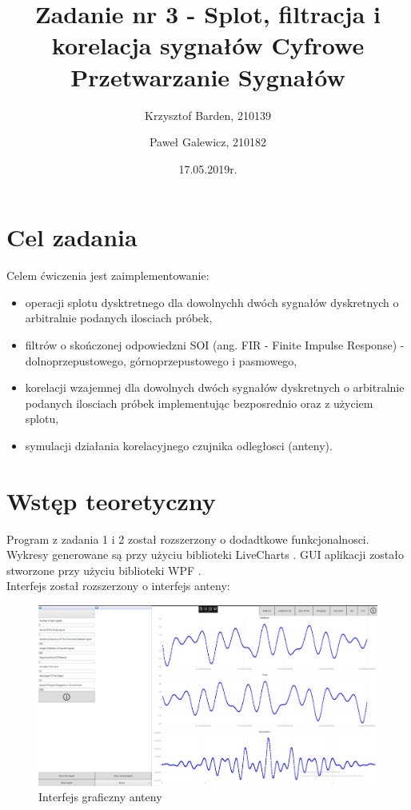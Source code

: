 \documentclass[12pt]{article}
\title{{\bf Zadanie nr 3 - Splot, filtracja i korelacja sygnałów}\linebreak
Cyfrowe Przetwarzanie Sygnałów}
\author{Krzysztof Barden, 210139 \and Paweł Galewicz, 210182}
\date{17.05.2019r.}
\begin{document}
\clearpage\maketitle
\thispagestyle{empty}
\newpage
\setcounter{page}{1}
\section{Cel zadania}

Celem ćwiczenia jest zaimplementowanie:
\begin{itemize}
\item operacji splotu dysktretnego dla dowolnychh dwóch sygnałów dyskretnych o arbitralnie podanych ilosciach próbek,
\item filtrów o skończonej odpowiedzni SOI (ang. FIR - Finite Impulse Response) - dolnoprzepustowego, górnoprzepustowego i pasmowego,
\item korelacji wzajemnej dla dowolnych dwóch sygnałów dyskretnych o arbitralnie podanych ilosciach próbek implementując bezposrednio oraz z użyciem splotu,
\item symulacji działania korelacyjnego czujnika odległosci (anteny).
\end{itemize}

\section{Wstęp teoretyczny}

Program z zadania 1 i 2 został rozszerzony o dodadtkowe funkcjonalnosci. Wykresy generowane są przy użyciu biblioteki LiveCharts \cite{lv}. GUI aplikacji zostało stworzone przy użyciu biblioteki WPF \cite{wpf}.
\\Interfejs został rozszerzony o interfejs anteny:
\begin{figure}[H]
 \centering
 \includegraphics[width=15cm]{images/gui1.PNG}
 \vspace{-0.3cm}
 \caption{Interfejs graficzny anteny}
 \label{gui}
\end{figure}
\end{document}
